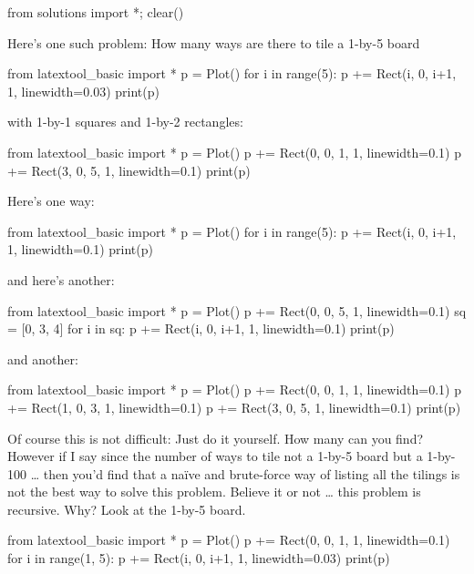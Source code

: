 \begin{python0}
from solutions import *; clear()
\end{python0}

Here's one such problem: How many ways are there to tile
a 1-by-5 board

\begin{python}
from latextool_basic import *
p = Plot()
for i in range(5):
    p += Rect(i, 0, i+1, 1, linewidth=0.03)
print(p)
\end{python}

with 1-by-1 squares and 1-by-2 rectangles:

\begin{python}
from latextool_basic import *
p = Plot()
p += Rect(0, 0, 1, 1, linewidth=0.1)
p += Rect(3, 0, 5, 1, linewidth=0.1)
print(p)
\end{python}

Here's one way:

\begin{python}
from latextool_basic import *
p = Plot()
for i in range(5):
    p += Rect(i, 0, i+1, 1, linewidth=0.1)
print(p)
\end{python}

and here's another:

\begin{python}
from latextool_basic import *
p = Plot()
p += Rect(0, 0, 5, 1, linewidth=0.1)
sq = [0, 3, 4]
for i in sq:
    p += Rect(i, 0, i+1, 1, linewidth=0.1)
print(p)
\end{python}

and another:

\begin{python}
from latextool_basic import *
p = Plot()
p += Rect(0, 0, 1, 1, linewidth=0.1)
p += Rect(1, 0, 3, 1, linewidth=0.1)
p += Rect(3, 0, 5, 1, linewidth=0.1)
print(p)
\end{python}

Of course this is not difficult: Just do it yourself. How many can you find? However if I say since the number of ways to tile not a 1-by-5 board but a 1-by-100 \ldots{} then you'd find that a na\"ive and brute-force way of listing all the tilings is not the best way to solve this problem. Believe it or not \ldots{} this problem is recursive. Why? Look at the 1-by-5 board.

\begin{python}
from latextool_basic import *
p = Plot()
p += Rect(0, 0, 1, 1, linewidth=0.1)
for i in range(1, 5):
    p += Rect(i, 0, i+1, 1, linewidth=0.03)
print(p)
\end{python}

